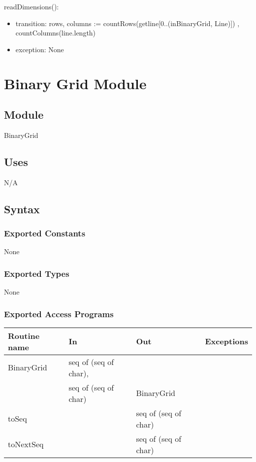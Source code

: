 \documentclass[12pt]{article}
\begin{document}
\noindent readDimensions():
\begin{itemize}
\item transition: rows, columns := countRows(getline[0..(inBinaryGrid, Line)]) , countColumns(line.length)

\item exception: None
\end{itemize}

\newpage




\section* {Binary Grid Module}

\subsection*{Module}

BinaryGrid

\subsection* {Uses}

N/A

\subsection* {Syntax}

\subsubsection* {Exported Constants}

None

\subsubsection* {Exported Types}

None

\subsubsection* {Exported Access Programs}

\begin{tabular}{| l | l | l | l |}
\hline
\textbf{Routine name} & \textbf{In} & \textbf{Out} & \textbf{Exceptions}\\
\hline
BinaryGrid & seq of (seq of char), &~ & \\
~ & seq of (seq of char) &  BinaryGrid & \\
\hline
toSeq & ~ & seq of (seq of char) & ~\\
\hline
toNextSeq & ~ & seq of (seq of char) & ~\\
\hline
\end{tabular}
\end{document}
